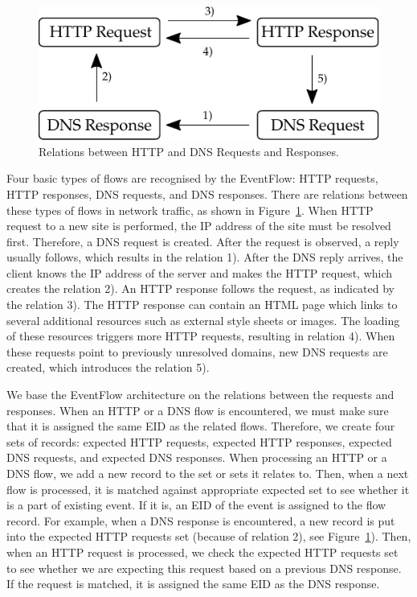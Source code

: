 \begin{figure}[!tb]
    \centering 
    \includegraphics{figures/paper-eventflow/dependencies}
    \caption{Relations between HTTP and DNS Requests and Responses.}
    \label{fig:eventflow-relations}
\end{figure}

Four basic types of flows are recognised by the EventFlow: HTTP requests, HTTP responses, DNS requests, and DNS responses. There are relations between these types of flows in network traffic, as shown in Figure~\ref{fig:eventflow-relations}. When HTTP request to a new site is performed, the IP address of the site must be resolved first. Therefore, a DNS request is created. After the request is observed, a reply usually follows, which results in the relation 1). After the DNS reply arrives, the client knows the IP address of the server and makes the HTTP request, which creates the relation 2). An HTTP response follows the request, as indicated by the relation 3). The HTTP response can contain an HTML page which links to several additional resources such as external style sheets or images. The loading of these resources triggers more HTTP requests, resulting in relation 4). When these requests point to previously unresolved domains, new DNS requests are created, which introduces the relation 5).

We base the EventFlow architecture on the relations between the requests and responses. When an HTTP or a DNS flow is encountered, we must make sure that it is assigned the same EID as the related flows. Therefore, we create four sets of records: expected HTTP requests, expected HTTP responses, expected DNS requests, and expected DNS responses. When processing an HTTP or a DNS flow, we add a new record to the set or sets it relates to. Then, when a next flow is processed, it is matched against appropriate expected set to see whether it is a part of existing event. If it is, an EID of the event is assigned to the flow record. For example, when a DNS response is encountered, a new record is put into the expected HTTP requests set (because of relation 2), see Figure~\ref{fig:eventflow-relations}). Then, when an HTTP request is processed, we check the expected HTTP requests set to see whether we are expecting this request based on a previous DNS response. If the request is matched, it is assigned the same EID as the DNS response. 


